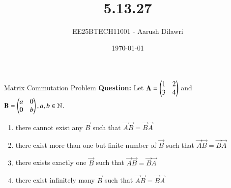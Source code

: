 \documentclass{beamer}
\title{5.13.27}
\date{\today}
\author{EE25BTECH11001 - Aarush Dilawri}
\begin{document}
\frame{\titlepage}

\begin{frame}{Matrix Commutation Problem}
\textbf{Question:} Let $\mathbf{A}=\begin{pmatrix}1 & 2 \\ 3 & 4\end{pmatrix}$ and $\mathbf{B} = \begin{pmatrix}a & 0 \\ 0 & b\end{pmatrix}, a,b \in \mathbb{N}$.

\begin{enumerate}[label=(\alph*)]
    \item there cannot exist any $\vec{B}$ such that $\vec{A}\vec{B} = \vec{B}\vec{A}$
    \item there exist more than one but finite number of $\vec{B}$ such that $\vec{A}\vec{B} = \vec{B}\vec{A}$
    \item there exists exactly one $\vec{B}$ such that $\vec{A}\vec{B} = \vec{B}\vec{A}$
    \item there exist infinitely many $\vec{B}$ such that $\vec{A}\vec{B} = \vec{B}\vec{A}$
\end{enumerate}
\end{frame}
\end{document}
